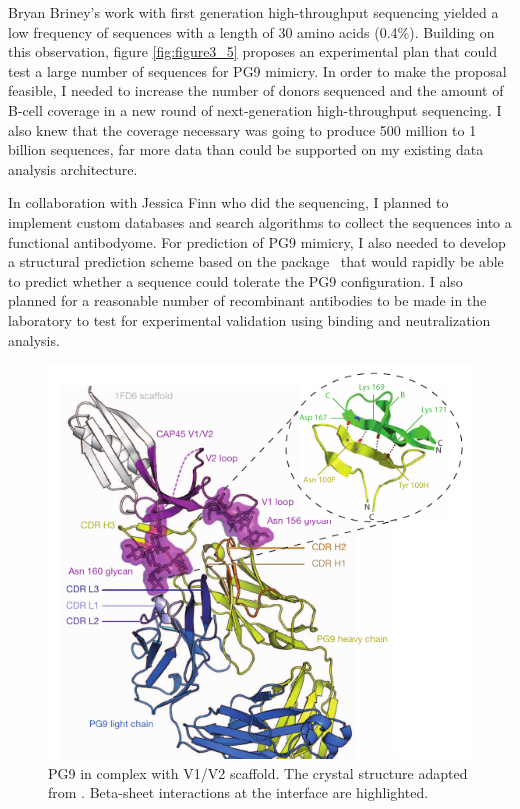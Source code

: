 Bryan Briney's work with first generation high-throughput sequencing yielded a low frequency of sequences with a length of 30 amino acids (0.4\%). Building on this observation, figure \ref{fig:figure3_5} proposes an experimental plan that could test a large number of sequences for PG9 mimicry. In order to make the proposal feasible, I needed to increase the number of donors sequenced and the amount of B-cell coverage in a new round of next-generation high-throughput sequencing.  I also knew that the coverage necessary was going to produce 500 million to 1 billion sequences, far more data than could be supported on my existing data analysis architecture.

In collaboration with Jessica Finn who did the sequencing, I planned to implement custom databases and search algorithms to collect the sequences into a functional antibodyome. For prediction of PG9 mimicry, I also needed to develop a structural prediction scheme based on the package \rosetta~that would rapidly be able to predict whether a sequence could tolerate the PG9 configuration. I also planned for a reasonable number of recombinant antibodies to be made in the laboratory to test for experimental validation using binding and neutralization analysis.

\begin{figure}
   \centering
   \includegraphics[scale=.9]{images/chapter3/figure3_3.pdf} %
   \caption[PG9 Complexed with V1/V2 Scaffold]{PG9 in complex with V1/V2 scaffold. The crystal structure adapted from  \citep{McLellan:2011dg}. Beta-sheet interactions at the interface are highlighted.}
   \label{fig:figure3_3}
\end{figure}


